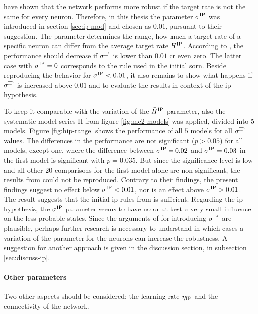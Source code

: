 \textcite{hartmann2015s} have shown that the network performs more robust if the target rate is not the same for every neuron. Therefore, in this thesis the parameter $\sigma^{\text{IP}}$ was introduced in section \ref{sec:ip-mod} and chosen as $0.01$, pursuant to their suggestion. The parameter determines the range, how much a target rate of a specific neuron can differ from the average target rate $\bar H^{\text{IP}}$. According to \textcite{hartmann2015s}, the performance should decrease if $\sigma^{\text{IP}}$ is lower than $0.01$ or even zero. The latter case with $\sigma^{\text{IP}} = 0$ corresponds to the rule \textcite{lazar2009sorn} used in the initial \acs{sorn}. Beside reproducing the behavior for $\sigma^{\text{IP}} < 0.01$, it also remains to show what happens if $\sigma^{\text{IP}}$ is increased above $0.01$ and to evaluate the results in context of the \acs{ip}-hypothesis.

To keep it comparable with the variation of the $\bar H^{\text{IP}}$ parameter, also the systematic model series II from figure \ref{fig:mc2-models} was applied, divided into $5$ models. Figure \ref{fig:hip-range} shows the  performance of all $5$ models for all $\sigma^{\text{IP}}$ values. The differences in the performance are not significant ($p > 0.05$) for all models, except one, where the difference between $\sigma^{\text{IP}} = 0.02$ and $\sigma^{\text{IP}} = 0.03$ in the first model is significant with $p = 0.035$. But since the significance level is low and all other $20$ comparisons for the first model alone are non-significant, the results from \textcite{hartmann2015s} could not be reproduced. Contrary to their findings, the present findings suggest no effect below $\sigma^{\text{IP}} < 0.01$, nor is an effect above $\sigma^{\text{IP}} > 0.01$. The result suggests that the initial \acs{ip} rules from \textcite{lazar2009sorn} is sufficient. Regarding the \acs{ip}-hypothesis, the $\sigma^{\text{IP}}$ parameter seems to have no or at best a very small influence on the less probable states. Since the arguments of \textcite{hartmann2015s} for introducing $\sigma^{\text{IP}}$ are plausible, perhaps further research is necessary to understand in which cases a variation of the parameter for the neurons can increase the robustness. A suggestion for another approach is given in the discussion section, in subsection \ref{sec:discuss-ip}.

\paragraph{Other parameters}

Two other aspects should be considered: the learning rate $\eta_{\text{IP}}$ and the connectivity of the network.

